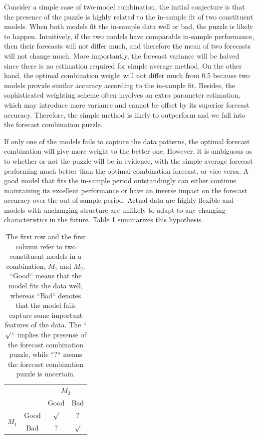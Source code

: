 \documentclass{monashthesis}
\begin{document}
Consider a simple case of two-model combination, the initial conjecture is that the presence of the puzzle is highly related to the in-sample fit of two constituent models. When both models fit the in-sample data well or bad, the puzzle is likely to happen. Intuitively, if the two models have comparable in-sample performance, then their forecasts will not differ much, and therefore the mean of two forecasts will not change much. More importantly, the forecast variance will be halved since there is no estimation required for simple average method. On the other hand, the optimal combination weight will not differ much from 0.5 because two models provide similar accuracy according to the in-sample fit. Besides, the sophisticated weighting scheme often involves an extra parameter estimation, which may introduce more variance and cannot be offset by its superior forecast accuracy. Therefore, the simple method is likely to outperform and we fall into the forecast combination puzzle.

If only one of the models fails to capture the data patterns, the optimal forecast combination will give more weight to the better one. However, it is ambiguous as to whether or not the puzzle will be in evidence, with the simple average forecast performing much better than the optimal combination forecast, or vice versa. A good model that fits the in-sample period outstandingly can either continue maintaining its excellent performance or have an inverse impact on the forecast accuracy over the out-of-sample period. Actual data are highly flexible and models with unchanging structure are unlikely to adapt to any changing characteristics in the future. Table \ref{tab:1} summarizes this hypothesis.

\begin{table}[ht]
\centering
\begin{tabular}{cccc}
                       &      & \multicolumn{2}{c}{$M_2$} \\
                       &      & Good       & Bad       \\
\multirow{2}{*}{$M_1$} & Good & $\surd$    & $?$ \\
                       & Bad  & $?$        & $\surd$
\end{tabular}
\caption{The first row and the first column refer to two constituent models in a combination, $M_1$ and $M_2$. ``Good`` means that the model fits the data well, whereas ``Bad`` denotes that the model fails capture some important features of the data. The ``$\surd$`` implies the presense of the forecast combination puzzle, while ``$?$`` means the forecast combination puzzle is uncertain.}
\label{tab:1}
\end{table}
\end{document}
